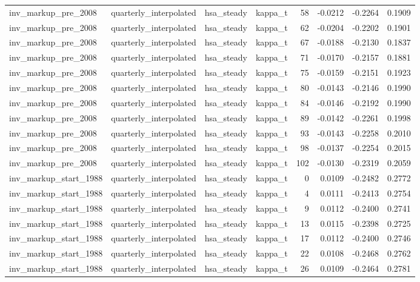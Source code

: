 \begin{tabular}{llllrrrr}
inv\_markup\_pre\_2008 & quarterly\_interpolated & hsa\_steady & kappa\_t & 58 & -0.0212 & -0.2264 & 0.1909 \\
inv\_markup\_pre\_2008 & quarterly\_interpolated & hsa\_steady & kappa\_t & 62 & -0.0204 & -0.2202 & 0.1901 \\
inv\_markup\_pre\_2008 & quarterly\_interpolated & hsa\_steady & kappa\_t & 67 & -0.0188 & -0.2130 & 0.1837 \\
inv\_markup\_pre\_2008 & quarterly\_interpolated & hsa\_steady & kappa\_t & 71 & -0.0170 & -0.2157 & 0.1881 \\
inv\_markup\_pre\_2008 & quarterly\_interpolated & hsa\_steady & kappa\_t & 75 & -0.0159 & -0.2151 & 0.1923 \\
inv\_markup\_pre\_2008 & quarterly\_interpolated & hsa\_steady & kappa\_t & 80 & -0.0143 & -0.2146 & 0.1990 \\
inv\_markup\_pre\_2008 & quarterly\_interpolated & hsa\_steady & kappa\_t & 84 & -0.0146 & -0.2192 & 0.1990 \\
inv\_markup\_pre\_2008 & quarterly\_interpolated & hsa\_steady & kappa\_t & 89 & -0.0142 & -0.2261 & 0.1998 \\
inv\_markup\_pre\_2008 & quarterly\_interpolated & hsa\_steady & kappa\_t & 93 & -0.0143 & -0.2258 & 0.2010 \\
inv\_markup\_pre\_2008 & quarterly\_interpolated & hsa\_steady & kappa\_t & 98 & -0.0137 & -0.2254 & 0.2015 \\
inv\_markup\_pre\_2008 & quarterly\_interpolated & hsa\_steady & kappa\_t & 102 & -0.0130 & -0.2319 & 0.2059 \\
inv\_markup\_start\_1988 & quarterly\_interpolated & hsa\_steady & kappa\_t & 0 & 0.0109 & -0.2482 & 0.2772 \\
inv\_markup\_start\_1988 & quarterly\_interpolated & hsa\_steady & kappa\_t & 4 & 0.0111 & -0.2413 & 0.2754 \\
inv\_markup\_start\_1988 & quarterly\_interpolated & hsa\_steady & kappa\_t & 9 & 0.0112 & -0.2400 & 0.2741 \\
inv\_markup\_start\_1988 & quarterly\_interpolated & hsa\_steady & kappa\_t & 13 & 0.0115 & -0.2398 & 0.2725 \\
inv\_markup\_start\_1988 & quarterly\_interpolated & hsa\_steady & kappa\_t & 17 & 0.0112 & -0.2400 & 0.2746 \\
inv\_markup\_start\_1988 & quarterly\_interpolated & hsa\_steady & kappa\_t & 22 & 0.0108 & -0.2468 & 0.2762 \\
inv\_markup\_start\_1988 & quarterly\_interpolated & hsa\_steady & kappa\_t & 26 & 0.0109 & -0.2464 & 0.2781 \\

\end{tabular}
